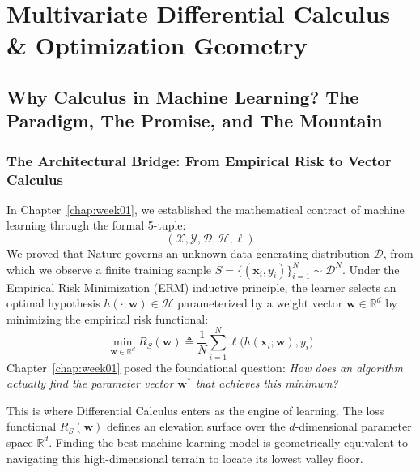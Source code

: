 \chapter[Differential Calculus for Learning]{Multivariate Differential Calculus \& Optimization Geometry}
\label{chap:week02}

\section{Why Calculus in Machine Learning? The Paradigm, The Promise, and The Mountain}

\subsection{The Architectural Bridge: From Empirical Risk to Vector Calculus}
In Chapter~\ref{chap:week01}, we established the mathematical contract of machine learning through the formal 5-tuple:
\begin{equation}
(\mathcal{X}, \mathcal{Y}, \mathcal{D}, \mathcal{H}, \ell)
\end{equation}
We proved that Nature governs an unknown data-generating distribution $\mathcal{D}$, from which we observe a finite training sample $S = \{(\mathbf{x}_i, y_i)\}_{i=1}^N \sim \mathcal{D}^N$. Under the Empirical Risk Minimization (ERM) inductive principle, the learner selects an optimal hypothesis $h(\cdot; \mathbf{w}) \in \mathcal{H}$ parameterized by a weight vector $\mathbf{w} \in \mathbb{R}^d$ by minimizing the empirical risk functional:
\begin{equation}
\min_{\mathbf{w} \in \mathbb{R}^d} R_S(\mathbf{w}) \triangleq \frac{1}{N}\sum_{i=1}^N \ell\big(h(\mathbf{x}_i; \mathbf{w}), y_i\big)
\label{eq:w02_erm_bridge}
\end{equation}
Chapter~\ref{chap:week01} posed the foundational question: \emph{How does an algorithm actually find the parameter vector $\mathbf{w}^*$ that achieves this minimum?}

This is where Differential Calculus enters as the engine of learning. The loss functional $R_S(\mathbf{w})$ defines an elevation surface over the $d$-dimensional parameter space $\mathbb{R}^d$. Finding the best machine learning model is geometrically equivalent to navigating this high-dimensional terrain to locate its lowest valley floor.

